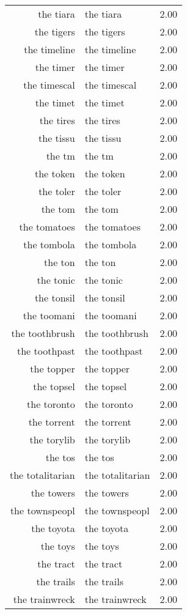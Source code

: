 \begin{table}[ht]
\begin{tabular}{rlr}
  the tiara & the tiara & 2.00 \\ 
  the tigers & the tigers & 2.00 \\ 
  the timeline & the timeline & 2.00 \\ 
  the timer & the timer & 2.00 \\ 
  the timescal & the timescal & 2.00 \\ 
  the timet & the timet & 2.00 \\ 
  the tires & the tires & 2.00 \\ 
  the tissu & the tissu & 2.00 \\ 
  the tm & the tm & 2.00 \\ 
  the token & the token & 2.00 \\ 
  the toler & the toler & 2.00 \\ 
  the tom & the tom & 2.00 \\ 
  the tomatoes & the tomatoes & 2.00 \\ 
  the tombola & the tombola & 2.00 \\ 
  the ton & the ton & 2.00 \\ 
  the tonic & the tonic & 2.00 \\ 
  the tonsil & the tonsil & 2.00 \\ 
  the toomani & the toomani & 2.00 \\ 
  the toothbrush & the toothbrush & 2.00 \\ 
  the toothpast & the toothpast & 2.00 \\ 
  the topper & the topper & 2.00 \\ 
  the topsel & the topsel & 2.00 \\ 
  the toronto & the toronto & 2.00 \\ 
  the torrent & the torrent & 2.00 \\ 
  the torylib & the torylib & 2.00 \\ 
  the tos & the tos & 2.00 \\ 
  the totalitarian & the totalitarian & 2.00 \\ 
  the towers & the towers & 2.00 \\ 
  the townspeopl & the townspeopl & 2.00 \\ 
  the toyota & the toyota & 2.00 \\ 
  the toys & the toys & 2.00 \\ 
  the tract & the tract & 2.00 \\ 
  the trails & the trails & 2.00 \\ 
  the trainwreck & the trainwreck & 2.00 \\ 

\end{tabular}
\end{table}
